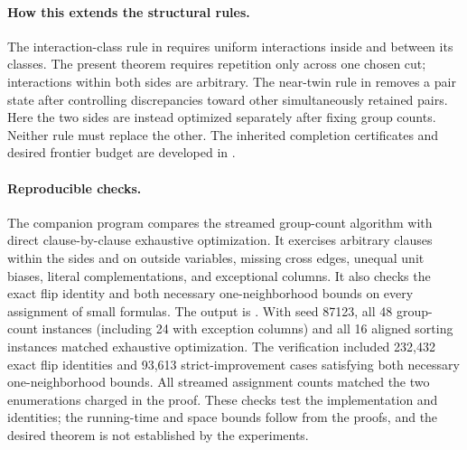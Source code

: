 \documentclass[11pt,a4paper]{article}
\theoremstyle{definition}
\begin{document}
\paragraph{How this extends the structural rules.}
The interaction-class rule in
 requires uniform interactions
inside and between its classes. The present theorem requires repetition
only across one chosen cut; interactions within both sides are arbitrary.
The near-twin rule in  removes a pair
state after controlling discrepancies toward other simultaneously retained
pairs. Here the two sides are instead optimized separately after fixing
group counts. Neither rule must replace the other. The inherited
completion certificates and desired frontier budget are developed in
.

\paragraph{Reproducible checks.}
The companion program  compares the
streamed group-count algorithm with direct clause-by-clause exhaustive
optimization. It exercises arbitrary clauses within the sides and on
outside variables, missing cross edges, unequal unit biases, literal
complementations, and exceptional columns. It also checks the exact
flip identity and both necessary one-neighborhood bounds on every
assignment of small formulas. The output is
. With seed 87123, all 48 group-count
instances (including 24 with exception columns) and all 16 aligned
sorting instances matched exhaustive optimization. The verification
included 232,432 exact flip identities and 93,613 strict-improvement
cases satisfying both necessary one-neighborhood bounds. All streamed
assignment counts matched the two enumerations charged in the proof.
These checks test the implementation and
identities; the running-time and space bounds follow from the proofs,
and the desired theorem is not established by the experiments.
\end{document}
